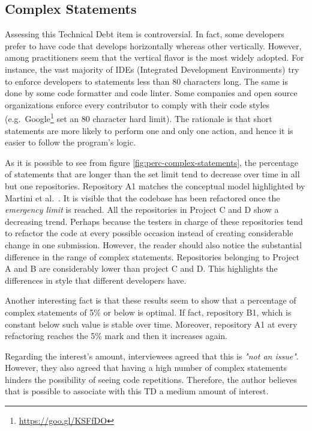 	\subsection{Complex Statements}


	Assessing this Technical Debt item is controversial. In fact, some developers prefer to have code that develops horizontally whereas other vertically. However, among practitioners seem that the vertical flavor is the most widely adopted. For instance, the vast majority of IDEs (Integrated Development Environments) try to enforce developers to statements less than 80 characters long. The same is done by some code formatter and code linter. Some companies and open source organizations enforce every contributor to comply with their code styles (e.g.\ Google\footnote{\href{https://goo.gl/KSFfDO}{https://goo.gl/KSFfDO}} set an 80 character hard limit). The rationale is that short statements are more likely to perform one and only one action, and hence it is easier to follow the program's logic.

    As it is possible to see from figure \ref{fig:perc-complex-statements}, the percentage of statements that are longer than the set limit tend to decrease over time in all but one repositories. Repository A1 matches the conceptual model highlighted by Martini et al.\ . It is visible that the codebase has been refactored once the \textit{emergency limit} is reached. All the repositories in Project C and D show a decreasing trend. Perhaps because the testers in charge of these repositories tend to refactor the code at every possible occasion instead of creating considerable change in one submission. However, the reader should also notice the substantial difference in the range of complex statements. Repositories belonging to Project A and B are considerably lower than project C and D. This highlights the differences in style that different developers have.

    Another interesting fact is that these results seem to show that a percentage of complex statements of 5\% or below is optimal. If fact, repository B1, which is constant below such value is stable over time. Moreover, repository A1 at every refactoring reaches the 5\% mark and then it increases again.

     \label{sec:disc-rq3-complex-statements}
    Regarding the interest's amount, interviewees agreed that this is \textit{"not an issue"}. However, they also agreed that having a high number of complex statements hinders the possibility of seeing code repetitions. Therefore, the author believes that is possible to associate with this TD a medium amount of interest.

